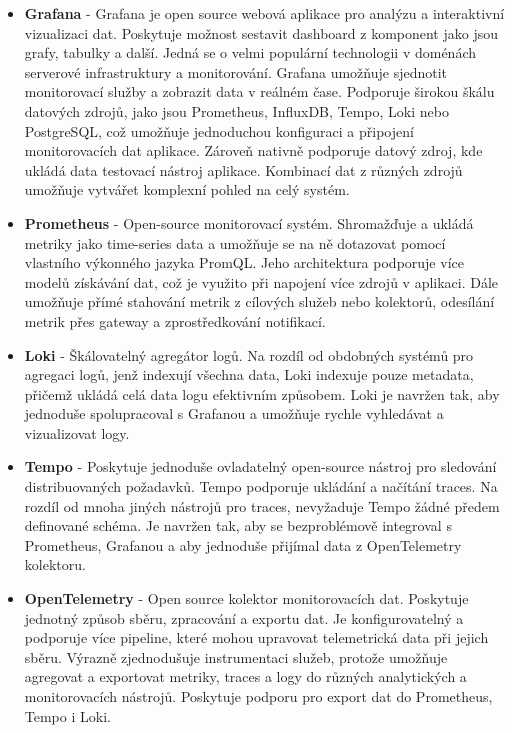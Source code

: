 \begin{itemize}
  \item \textbf{Grafana} - Grafana je open source webová aplikace pro analýzu a interaktivní vizualizaci dat. Poskytuje možnost sestavit dashboard z komponent jako jsou grafy, tabulky a další. Jedná se o velmi populární technologii v doménách serverové infrastruktury a monitorování. Grafana umožňuje sjednotit monitorovací služby a zobrazit data v reálném čase. Podporuje širokou škálu datových zdrojů, jako jsou Prometheus, InfluxDB, Tempo, Loki nebo PostgreSQL, což umožňuje jednoduchou konfiguraci a připojení monitorovacích dat aplikace. Zároveň nativně podporuje datový zdroj, kde ukládá data testovací nástroj aplikace. Kombinací dat z různých zdrojů umožňuje vytvářet komplexní pohled na celý systém.
  \item \textbf{Prometheus} - Open-source monitorovací systém. Shromažďuje a ukládá metriky jako time-series data a umožňuje se na ně dotazovat pomocí vlastního výkonného jazyka PromQL. Jeho architektura podporuje více modelů získávání dat, což je využito při napojení více zdrojů v aplikaci. Dále umožňuje přímé stahování metrik z cílových služeb nebo kolektorů, odesílání metrik přes gateway a zprostředkování notifikací.
  \item \textbf{Loki} - Škálovatelný agregátor logů. Na rozdíl od obdobných systémů pro agregaci logů, jenž indexují všechna data, Loki indexuje pouze metadata, přičemž ukládá celá data logu efektivním způsobem. Loki je navržen tak, aby jednoduše spolupracoval s Grafanou a umožňuje rychle vyhledávat a vizualizovat logy.
  \item \textbf{Tempo} - Poskytuje jednoduše ovladatelný open-source nástroj pro sledování distribuovaných požadavků. Tempo podporuje ukládání a načítání traces. Na rozdíl od mnoha jiných nástrojů pro traces, nevyžaduje Tempo žádné předem definované schéma. Je navržen tak, aby se bezproblémově integroval s Prometheus, Grafanou a aby jednoduše přijímal data z OpenTelemetry kolektoru.
  \item \textbf{OpenTelemetry} - Open source kolektor monitorovacích dat. Poskytuje jednotný způsob sběru, zpracování a exportu dat. Je konfigurovatelný a podporuje více pipeline, které mohou upravovat telemetrická data při jejich sběru. Výrazně zjednodušuje instrumentaci služeb, protože umožňuje agregovat a exportovat metriky, traces a logy do různých analytických a monitorovacích nástrojů. Poskytuje podporu pro export dat do Prometheus, Tempo i Loki.
\end{itemize}

